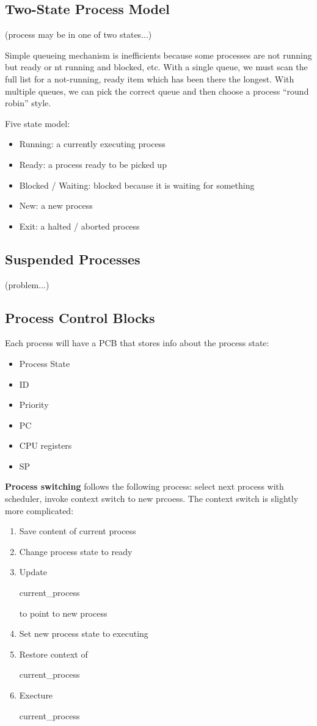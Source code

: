 \documentclass[12pt]{article}
\begin{document}
\subsection{Two-State Process Model}
(process may be in one of two states...)

Simple queueing mechanism is inefficients because some processes are not running but ready or nt running and blocked, etc. With a single queue, we must scan the full list for a not-running, ready item which has been there the longest. With multiple queues, we can pick the correct queue and then choose a process ``round robin'' style.

Five state model:
\begin{itemize}
\item Running: a currently executing process
\item Ready: a process ready to be picked up
\item Blocked / Waiting: blocked because it is waiting for something
\item New: a new process
\item Exit: a halted / aborted process
\end{itemize}

\subsection{Suspended Processes}
(problem...)

\subsection{Process Control Blocks}
Each process will have a PCB that stores info about the process state:
\begin{itemize}
\item Process State
\item ID
\item Priority
\item PC
\item CPU registers
\item SP
\end{itemize}

{\bf Process switching} follows the following process: select next process with scheduler, invoke context switch to new prcoess. The context switch is slightly more complicated:
\begin{enumerate}
\item Save content of current process
\item Change process state to ready
\item Update \begin{code}current\_process\end{code} to point to new process
\item Set new process state to executing
\item Restore context of \begin{code}current\_process\end{code}
\item Execture \begin{code}current\_process\end{code}
\end{enumerate}
\end{document}
